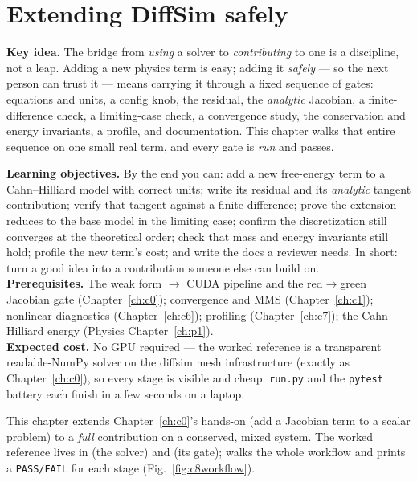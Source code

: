 \chapter{Extending DiffSim safely}
\label{ch:c8}
\begin{keybox}
\textbf{Key idea.} The bridge from \emph{using} a solver to \emph{contributing}
to one is a discipline, not a leap. Adding a new physics term is easy; adding
it \emph{safely} --- so the next person can trust it --- means carrying it
through a fixed sequence of gates: equations and units, a config knob, the
residual, the \emph{analytic} Jacobian, a finite-difference check, a
limiting-case check, a convergence study, the conservation and energy
invariants, a profile, and documentation. This chapter walks that entire
sequence on one small real term, and every gate is \emph{run} and passes.
\end{keybox}

\begin{keybox}
\textbf{Learning objectives.} By the end you can: add a new free-energy term to
a Cahn--Hilliard model with correct units; write its residual and its
\emph{analytic} tangent contribution; verify that tangent against a finite
difference; prove the extension reduces to the base model in the limiting case;
confirm the discretization still converges at the theoretical order; check that
mass and energy invariants still hold; profile the new term's cost; and write
the docs a reviewer needs. In short: turn a good idea into a contribution
someone else can build on.\\[2pt]
\textbf{Prerequisites.} The weak form $\to$ CUDA pipeline and the
red$\to$green Jacobian gate (Chapter~\ref{ch:c0}); convergence and MMS
(Chapter~\ref{ch:c1}); nonlinear diagnostics (Chapter~\ref{ch:c6}); profiling
(Chapter~\ref{ch:c7}); the Cahn--Hilliard energy (Physics
Chapter~\ref{ch:p1}).\\[2pt]
\textbf{Expected cost.} No GPU required --- the worked reference is a
transparent readable-NumPy solver on the diffsim mesh infrastructure (exactly
as Chapter~\ref{ch:c0}), so every stage is visible and cheap. \texttt{run.py}
and the \texttt{pytest} battery each finish in a few seconds on a laptop.
\end{keybox}

This chapter extends Chapter~\ref{ch:c0}'s hands-on (add a Jacobian term to a
scalar problem) to a \emph{full} contribution on a conserved, mixed system. The
worked reference lives in  (the solver) and
 (its gate);  walks the whole workflow
and prints a \texttt{PASS/FAIL} for each stage (Fig.~\ref{fig:c8workflow}).

